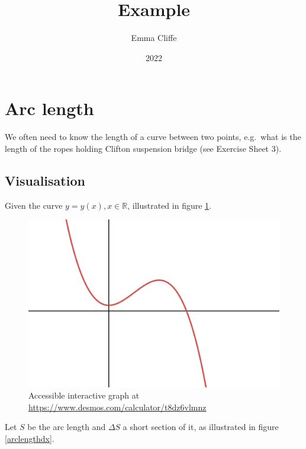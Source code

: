 \documentclass[12pt,a4paper]{article}
\title{Example}
\author{Emma Cliffe}
\date{2022}
\newcommand{\RR}{\mathbb{R}}
\begin{document}
\maketitle

\tableofcontents

\section{Arc length}

We often need to know the length of a curve between two points,
e.g.~what is the length of the ropes holding Clifton suspension bridge
(see Exercise Sheet 3).

\subsection{Visualisation}

Given the curve \(y=y(x), x \in \RR\), illustrated in figure \ref{arclength1}.

\begin{figure}[!hptb]
\begin{center}
\includegraphics[height=0.25\textheight]{arclength1} \caption{Accessible interactive graph at \url{https://www.desmos.com/calculator/t8dz6vlmnz}}\label{arclength1}
\end{center}
\end{figure}

Let \(S\) be the arc length and \(\Delta S\) a short section of it, as illustrated in figure \ref{arclengthdx}.
\end{document}
